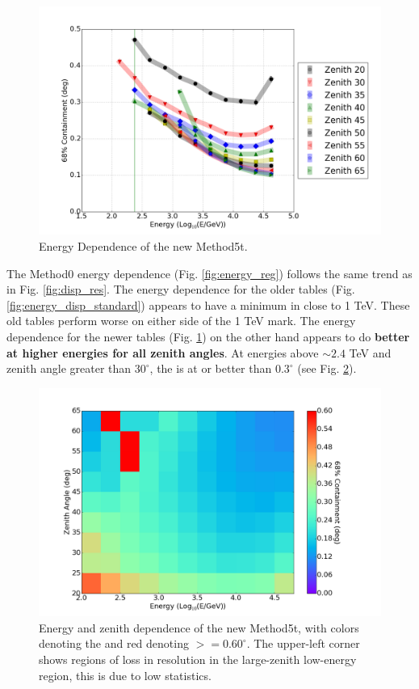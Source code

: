 \documentclass[main.tex]{subfiles}
\begin{document}
\begin{figure}[htbp]
  \centering
  \includegraphics[width=.9\linewidth]{images/disp_450x4size_energy}
  \caption{Energy Dependence of the new Method5t.}
  \label{fig:energy_disp_450}    
\end{figure}

The Method0 energy dependence (Fig. \ref{fig:energy_reg}) follows the same trend as in Fig. \ref{fig:disp_res}. The energy dependence for the older \disp tables (Fig. \ref{fig:energy_disp_standard}) appears to have a minimum in \rse close to 1 TeV. These old \disp tables perform worse on either side of the 1 TeV mark. The energy dependence for the newer \disp tables (Fig. \ref{fig:energy_disp_450}) on the other hand appears to do {\bf better at higher energies for all zenith angles}. At energies above $\sim 2.4$ TeV and zenith angle greater than $30^\circ$, the \rse is at or better than $0.3^\circ$ (see Fig. \ref{fig:energy_new_contour}).

\begin{figure}[htbp]
  \centering
  \includegraphics[width=.9\linewidth]{images/disp_450x4size_rse}
  \caption[Energy and zenith dependence of the new Method5t.]{Energy and zenith dependence of the new Method5t, with colors denoting the \rse and red denoting \rse$>=0.60^\circ$. The upper-left corner shows regions of loss in resolution in the large-zenith low-energy region, this is due to low statistics.}
  \label{fig:energy_new_contour}
\end{figure}
\end{document}
